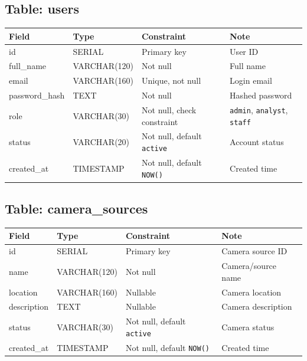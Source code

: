 \documentclass[12pt,a4paper]{report}
\begin{document}
{\small
\subsection{Table: users}
\begin{longtable}{|p{3.2cm}|p{3cm}|p{4.2cm}|p{4.5cm}|}
\hline
\rowcolor{HeaderBlue}
\textbf{Field} & \textbf{Type} & \textbf{Constraint} & \textbf{Note} \\
\hline
id & SERIAL & Primary key & User ID \\
\hline
full\_name & VARCHAR(120) & Not null & Full name \\
\hline
email & VARCHAR(160) & Unique, not null & Login email \\
\hline
password\_hash & TEXT & Not null & Hashed password \\
\hline
role & VARCHAR(30) & Not null, check constraint & \texttt{admin}, \texttt{analyst}, \texttt{staff} \\
\hline
status & VARCHAR(20) & Not null, default \texttt{active} & Account status \\
\hline
created\_at & TIMESTAMP & Not null, default \texttt{NOW()} & Created time \\
\hline
\end{longtable}

\subsection{Table: camera\_sources}
\begin{longtable}{|p{3.2cm}|p{3cm}|p{4.2cm}|p{4.5cm}|}
\hline
\rowcolor{HeaderBlue}
\textbf{Field} & \textbf{Type} & \textbf{Constraint} & \textbf{Note} \\
\hline
id & SERIAL & Primary key & Camera source ID \\
\hline
name & VARCHAR(120) & Not null & Camera/source name \\
\hline
location & VARCHAR(160) & Nullable & Camera location \\
\hline
description & TEXT & Nullable & Camera description \\
\hline
status & VARCHAR(30) & Not null, default \texttt{active} & Camera status \\
\hline
created\_at & TIMESTAMP & Not null, default \texttt{NOW()} & Created time \\
\hline
\end{longtable}

}
\end{document}
